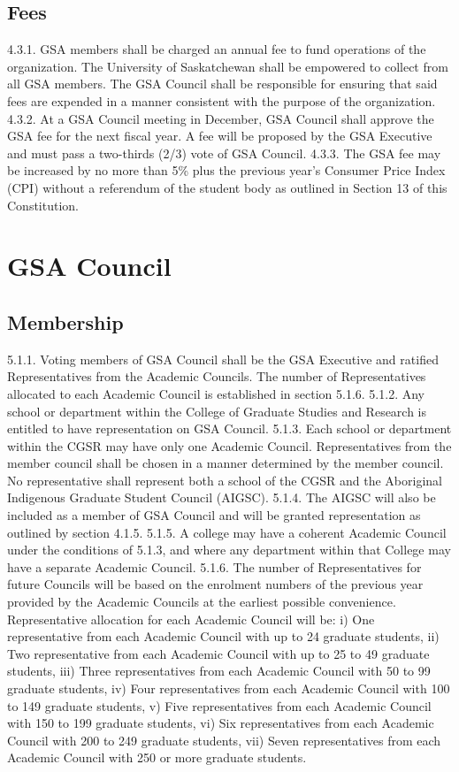 \subsection{Fees }
4.3.1. GSA members shall be charged an annual fee to fund operations of the 
organization. The University of Saskatchewan shall be empowered to 
collect from all GSA members. The GSA Council shall be responsible 
for ensuring that said fees are expended in a manner consistent with 
the purpose of the organization. 
4.3.2. At a GSA Council meeting in December, GSA Council shall approve 
the GSA fee for the next fiscal year. A fee will be proposed by the 
GSA Executive and must pass a two-thirds (2/3) vote of GSA Council. 
4.3.3. The GSA fee may be increased by no more than 5\% plus the previous 
year’s Consumer Price Index (CPI) without a referendum of the 
student body as outlined in Section 13 of this Constitution. 
\section{GSA Council }
\subsection{Membership }
5.1.1. Voting members of GSA Council shall be the GSA Executive and 
ratified Representatives from the Academic Councils. The number of 
Representatives allocated to each Academic Council is established in 
section 5.1.6. 
5.1.2. Any school or department within the College of Graduate Studies and 
Research is entitled to have representation on GSA Council. 
5.1.3. Each school or department within the CGSR may have only one 
Academic Council. Representatives from the member council shall be 
chosen in a manner determined by the member council. No 
representative shall represent both a school of the CGSR and the 
Aboriginal Indigenous Graduate Student Council (AIGSC). 
5.1.4. The AIGSC will also be included as a member of GSA Council and 
will be granted representation as outlined by section 4.1.5. 
5.1.5. A college may have a coherent Academic Council under the conditions 
of 5.1.3, and where any department within that College may have a 
separate Academic Council. 
5.1.6. The number of Representatives for future Councils will be based on 
the enrolment numbers of the previous year provided by the Academic 
Councils at the earliest possible convenience. Representative allocation for each Academic Council will be: 
i) One representative from each Academic Council with up to 24 
graduate students, 
ii) Two representative from each Academic Council with up to 25 to 49 
graduate students, 
iii) Three representatives from each Academic Council with 50 to 99 
graduate students, 
iv) Four representatives from each Academic Council with 100 to 149 
graduate students, 
v) Five representatives from each Academic Council with 150 to 199 
graduate students, 
vi) Six representatives from each Academic Council with 200 to 249 
graduate students, 
vii) Seven representatives from each Academic Council with 250 or more 
graduate students. 
